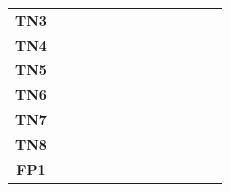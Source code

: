 \begin{table}
\begin{tabularx}{\textwidth}{ c *{12}{Y} }
    \textbf{TN3}  &                                   &                                       &                                         &                                           &                                        &                                         &             &            &             &            &             &            \\
    \textbf{TN4}  &                                   &                                       &                                         &                                           &                                        &                                         &             &            &             &            &             &            \\
    \textbf{TN5}  &                                   &                                       &                                         &                                           &                                        &                                         &             &            &             &            &             &            \\
    \textbf{TN6}  &                                   &                                       &                                         &                                           &                                        &                                         &             &            &             &            &             &            \\
    \textbf{TN7}  &                                   &                                       &                                         &                                           &                                        &                                         &             &            &             &            &             &            \\
    \textbf{TN8}  &                                   &                                       &                                         &                                           &                                        &                                         &             &            &             &            &             &            \\
    \textbf{FP1}  &                                   &                                       &                                         &                                           &                                        &                                         &             &            &             &            &             &            \\

\end{tabularx}
\end{table}
